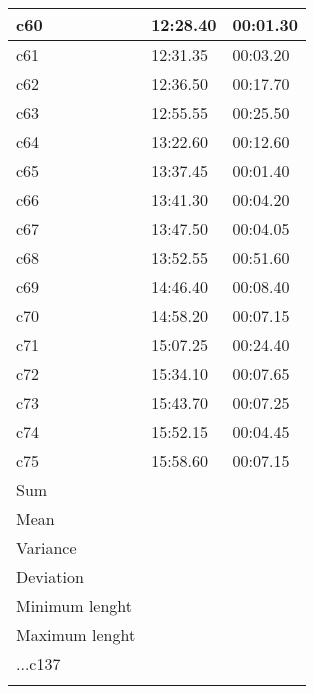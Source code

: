 \documentclass[a4paper,10pt]{report}
\begin{document}
\begin{longtable}[|c|]{|l|l|l|}
    c60                             & 12:28.40                        & 00:01.30 \\ \hline
    c61                             & 12:31.35                        & 00:03.20 \\ \hline
    c62                             & 12:36.50                        & 00:17.70 \\ \hline
    c63                             & 12:55.55                        & 00:25.50 \\ \hline
    c64                             & 13:22.60                        & 00:12.60 \\ \hline
    c65                             & 13:37.45                        & 00:01.40 \\ \hline
    c66                             & 13:41.30                        & 00:04.20 \\ \hline
    c67                             & 13:47.50                        & 00:04.05 \\ \hline
    c68                             & 13:52.55                        & 00:51.60 \\ \hline
    c69                             & 14:46.40                        & 00:08.40 \\ \hline
    c70                             & 14:58.20                        & 00:07.15 \\ \hline
    c71                             & 15:07.25                        & 00:24.40 \\ \hline
    c72                             & 15:34.10                        & 00:07.65 \\ \hline
    c73                             & 15:43.70                        & 00:07.25 \\ \hline
    c74                             & 15:52.15                        & 00:04.45 \\ \hline
    c75                             & 15:58.60                        & 00:07.15 \\ \hline
    Sum                             & ~                               & ~        \\ \hline
    Mean                            & ~                               & ~        \\ \hline
    Variance                        & ~                               & ~        \\ \hline
    Deviation                       & ~                               & ~        \\ \hline
    Minimum lenght                  & ~                               & ~        \\ \hline
    Maximum lenght                  & ~                               & ~        \\ \hline
    ...c137                         & ~                               & ~        \\ \hline
\label{tab:ngdata}
\end{longtable}
\end{document}
